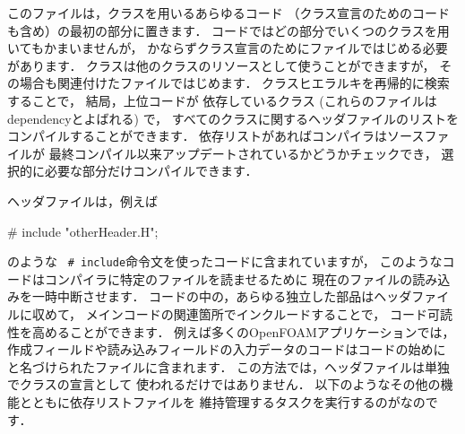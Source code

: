 このファイルは，クラスを用いるあらゆるコード
（クラス宣言のためのコードも含め）の最初の部分に置きます．
コードではどの部分でいくつのクラスを用いてもかまいませんが，
かならずクラス宣言のためにファイルではじめる必要があります．
クラスは他のクラスのリソースとして使うことができますが，
その場合も関連付けたファイルではじめます．
クラスヒエラルキを再帰的に検索することで，
結局，上位コードが
%
依存しているクラス
(これらのファイルはdependencyとよばれる) で，
すべてのクラスに関するヘッダファイルのリストを
コンパイルすることができます．
%
依存リストがあればコンパイラはソースファイルが
最終コンパイル以来アップデートされているかどうかチェックでき，
選択的に必要な部分だけコンパイルできます．

ヘッダファイルは，例えば
\begin{OFverbatim}[file]
# include "otherHeader.H";
\end{OFverbatim}
のような\ 
%
%
\verb|# include|命令文を使ったコードに含まれていますが，
このようなコードはコンパイラに特定のファイルを読ませるために
現在のファイルの読み込みを一時中断させます．
コードの中の，あらゆる独立した部品はヘッダファイルに収めて，
メインコードの関連箇所でインクルードすることで，
コード可読性を高めることができます．
例えば多くのOpenFOAMアプリケーションでは，
作成フィールドや読み込みフィールドの入力データのコードはコードの始めに
と名づけられたファイルに含まれます．
この方法では，ヘッダファイルは単独でクラスの宣言として
使われるだけではありません．
以下のようなその他の機能とともに依存リストファイルを
維持管理するタスクを実行するのがなのです．

